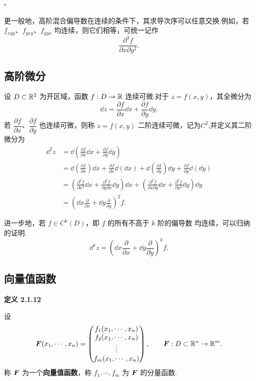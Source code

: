 $\square$



更一般地，高阶混合偏导数在连续的条件下，其求导次序可以任意交换.例如，若
$f_{xyy}$、$f_{yxy}$、$f_{yyx}$ 均连续，则它们相等，可统一记作
\[
\frac{\partial^3f}{\partial x\partial y^2}.
\]

\subsection*{高阶微分}

设 $D\subset\mathbb{R}^2$ 为开区域，函数 $f:D\to\mathbb{R}$ 连续可微.对于
$z=f(x,y)$，其全微分为
\[
\dd z=\frac{\partial f}{\partial x}\dd x
+\frac{\partial f}{\partial y}\dd y.
\]
若 $\dfrac{\partial f}{\partial x}$、$\dfrac{\partial f}{\partial y}$
也连续可微，则称 $z=f(x,y)$ 二阶连续可微，记为$C^2$,并定义其二阶微分为
\[
\begin{aligned}
\dd^2z
&=\dd\left(
\frac{\partial f}{\partial x}\dd x
+\frac{\partial f}{\partial y}\dd y
\right)\\
&=\dd\left(\frac{\partial f}{\partial x}\right)\dd x
+\frac{\partial f}{\partial x}\dd(\dd x)
+\dd\left(\frac{\partial f}{\partial y}\right)\dd y
+\frac{\partial f}{\partial y}\dd(\dd y)\\
&=
\left(
\frac{\partial^2f}{\partial x^2}\dd x
+\frac{\partial^2f}{\partial y\partial x}\dd y
\right)\dd x
+
\left(
\frac{\partial^2f}{\partial x\partial y}\dd x
+\frac{\partial^2f}{\partial y^2}\dd y
\right)\dd y\\
&=
\left(
\dd x\frac{\partial}{\partial x}
+\dd y\frac{\partial}{\partial y}
\right)^2f.
\end{aligned}
\]

进一步地，若 $f\in C^k(D)$，即 $f$ 的所有不高于 $k$ 阶的偏导数
均连续，可以归纳的证明.
\[
\dd^kz
=
\left(
\dd x\frac{\partial}{\partial x}
+\dd y\frac{\partial}{\partial y}
\right)^kf.
\]

\subsection*{向量值函数}



\textbf{定义 2.1.12}

设
	\[
	\boldsymbol{F}(x_1,\cdots,x_n)
	=
	\begin{pmatrix}
	f_1(x_1,\cdots,x_n)\\
	f_2(x_1,\cdots,x_n)\\
	\vdots\\
	f_m(x_1,\cdots,x_n)
	\end{pmatrix},
	\qquad
	\boldsymbol{F}:D\subset\mathbb{R}^n\to\mathbb{R}^m.
	\]
	称 $\boldsymbol{F}$ 为一个\textbf{向量值函数}，称
	$f_1,\cdots,f_m$ 为 $\boldsymbol{F}$ 的分量函数.




